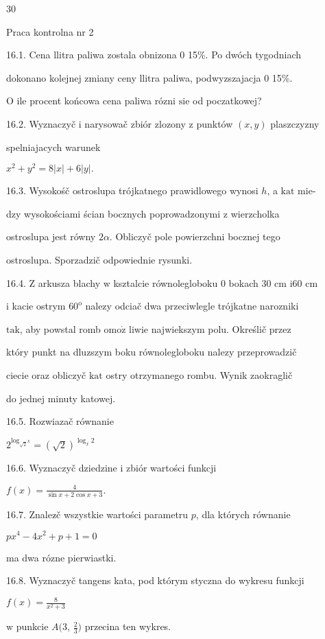 \documentclass[a4paper,12pt]{article}
\begin{document}
30

Praca kontrolna nr 2

16.1. Cena llitra paliwa zostala obnizona $0$ 15\%. Po dwóch tygodniach

dokonano kolejnej zmiany ceny llitra paliwa, podwyzszajacja $0$ 15\%.

$\mathrm{O}$ ile procent końcowa cena paliwa rózni $\mathrm{s}\mathrm{i}\mathrm{e}$ od poczatkowej?

16.2. Wyznaczyč $\mathrm{i}$ narysowač zbiór zlozony $\mathrm{z}$ punktów $(x,y)$ plaszczyzny

spelniajacych warunek

$x^{2}+y^{2}=8|x|+6|y|.$

16.3. Wysokośč ostroslupa trójkatnego prawidlowego wynosi $h$, a $\mathrm{k}\mathrm{a}\mathrm{t}$ mie-

dzy wysokościami ścian bocznych poprowadzonymi $\mathrm{z}$ wierzcholka

ostroslupa jest równy $ 2\alpha$. Obliczyč pole powierzchni bocznej tego

ostroslupa. Sporzadzič odpowiednie rysunki.

16.4. $\mathrm{Z}$ arkusza blachy $\mathrm{w}$ ksztalcie równolegloboku $0$ bokach 30 cm $\mathrm{i}60$ cm

$\mathrm{i}$ kacie ostrym $60^{\mathrm{o}}$ nalezy odciač dwa przeciwlegle trójkatne narozniki

$\mathrm{t}\mathrm{a}\mathrm{k}$, aby powstal romb $\mathrm{o}\mathrm{m}\mathrm{o}\dot{\mathrm{z}}$ liwie najwiekszym polu. Określič przez

który punkt na dluzszym boku równolegloboku nalezy przeprowadzič

ciecie oraz obliczyč $\mathrm{k}\mathrm{a}\mathrm{t}$ ostry otrzymanego rombu. Wynik zaokraglič

do jednej minuty katowej.

16.5. Rozwiazač równanie

$2^{\log_{\sqrt{2}^{X}}}=(\sqrt{2})^{\log_{x}2}$

16.6. Wyznaczyč dziedzine $\mathrm{i}$ zbiór wartości funkcji

$f(x)=\displaystyle \frac{4}{\sin x+2\cos x+3}.$

16.7. Znalez$\acute{}$č wszystkie wartości parametru $p$, dla których równanie

$px^{4}-4x^{2}+p+1=0$

ma dwa rózne pierwiastki.

16.8. Wyznaczyč tangens kata, pod którym styczna do wykresu funkcji

$f(x)=\displaystyle \frac{8}{x^{2}+3}$

$\mathrm{w}$ punkcie $A($3, $\displaystyle \frac{2}{3})$ przecina ten wykres.
\end{document}
